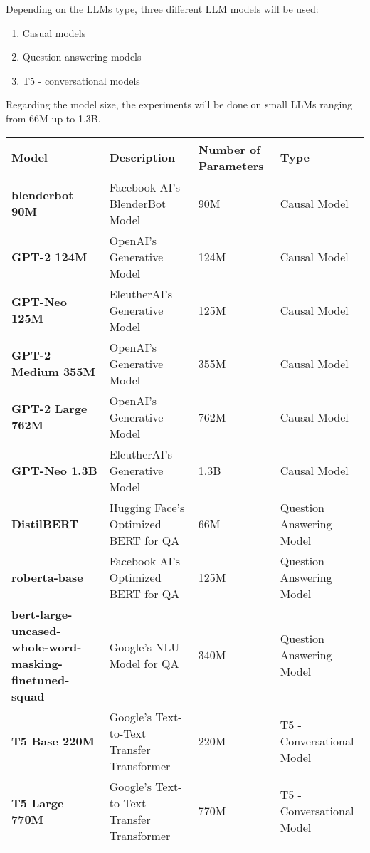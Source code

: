 \documentclass[11pt]{wseas}
\begin{document}
Depending on the LLMs type, three different LLM models will be used:

\begin{enumerate}
\def\labelenumi{\arabic{enumi}.}
\item
  Casual models
\item
  Question answering models
\item
  T5 - conversational models
\end{enumerate}

Regarding the model size, the experiments will be done on small LLMs
ranging from 66M up to 1.3B.

\begin{longtable}[]{@{}
  >{\raggedright\arraybackslash}p{}
  >{\raggedright\arraybackslash}p{}
  >{\raggedright\arraybackslash}p{}
  >{\raggedright\arraybackslash}p{}@{}}
\toprule\noalign{}
\begin{minipage}[b]{\linewidth}\raggedright
Model
\end{minipage} & \begin{minipage}[b]{\linewidth}\raggedright
Description
\end{minipage} & \begin{minipage}[b]{\linewidth}\raggedright
Number of Parameters
\end{minipage} & \begin{minipage}[b]{\linewidth}\raggedright
Type
\end{minipage} \\
\midrule\noalign{}
\endhead
\bottomrule\noalign{}
\endlastfoot
\textbf{blenderbot 90M} & Facebook AI's BlenderBot Model & 90M & Causal
Model \\
\textbf{GPT-2 124M} & OpenAI's Generative Model & 124M & Causal Model \\
\textbf{GPT-Neo 125M} & EleutherAI's Generative Model & 125M & Causal
Model \\
\textbf{GPT-2 Medium 355M} & OpenAI's Generative Model & 355M & Causal
Model \\
\textbf{GPT-2 Large 762M} & OpenAI's Generative Model & 762M & Causal
Model \\
\textbf{GPT-Neo 1.3B} & EleutherAI's Generative Model & 1.3B & Causal
Model \\
\textbf{DistilBERT} & Hugging Face's Optimized BERT for QA & 66M &
Question Answering Model \\
\textbf{roberta-base} & Facebook AI's Optimized BERT for QA & 125M &
Question Answering Model \\
\textbf{bert-large-uncased-whole-word-masking-finetuned-squad} &
Google's NLU Model for QA & 340M & Question Answering Model \\
\textbf{T5 Base 220M} & Google's Text-to-Text Transfer Transformer &
220M & T5 - Conversational Model \\
\textbf{T5 Large 770M} & Google's Text-to-Text Transfer Transformer &
770M & T5 - Conversational Model \\
\end{longtable}
\end{document}
